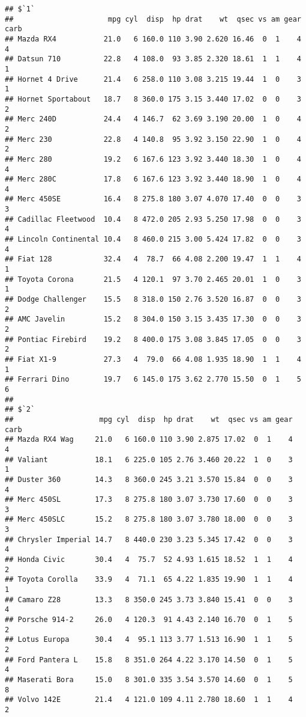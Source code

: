 \documentclass[
]{article}
\begin{document}
\begin{verbatim}
## $`1`
##                      mpg cyl  disp  hp drat    wt  qsec vs am gear carb
## Mazda RX4           21.0   6 160.0 110 3.90 2.620 16.46  0  1    4    4
## Datsun 710          22.8   4 108.0  93 3.85 2.320 18.61  1  1    4    1
## Hornet 4 Drive      21.4   6 258.0 110 3.08 3.215 19.44  1  0    3    1
## Hornet Sportabout   18.7   8 360.0 175 3.15 3.440 17.02  0  0    3    2
## Merc 240D           24.4   4 146.7  62 3.69 3.190 20.00  1  0    4    2
## Merc 230            22.8   4 140.8  95 3.92 3.150 22.90  1  0    4    2
## Merc 280            19.2   6 167.6 123 3.92 3.440 18.30  1  0    4    4
## Merc 280C           17.8   6 167.6 123 3.92 3.440 18.90  1  0    4    4
## Merc 450SE          16.4   8 275.8 180 3.07 4.070 17.40  0  0    3    3
## Cadillac Fleetwood  10.4   8 472.0 205 2.93 5.250 17.98  0  0    3    4
## Lincoln Continental 10.4   8 460.0 215 3.00 5.424 17.82  0  0    3    4
## Fiat 128            32.4   4  78.7  66 4.08 2.200 19.47  1  1    4    1
## Toyota Corona       21.5   4 120.1  97 3.70 2.465 20.01  1  0    3    1
## Dodge Challenger    15.5   8 318.0 150 2.76 3.520 16.87  0  0    3    2
## AMC Javelin         15.2   8 304.0 150 3.15 3.435 17.30  0  0    3    2
## Pontiac Firebird    19.2   8 400.0 175 3.08 3.845 17.05  0  0    3    2
## Fiat X1-9           27.3   4  79.0  66 4.08 1.935 18.90  1  1    4    1
## Ferrari Dino        19.7   6 145.0 175 3.62 2.770 15.50  0  1    5    6
## 
## $`2`
##                    mpg cyl  disp  hp drat    wt  qsec vs am gear carb
## Mazda RX4 Wag     21.0   6 160.0 110 3.90 2.875 17.02  0  1    4    4
## Valiant           18.1   6 225.0 105 2.76 3.460 20.22  1  0    3    1
## Duster 360        14.3   8 360.0 245 3.21 3.570 15.84  0  0    3    4
## Merc 450SL        17.3   8 275.8 180 3.07 3.730 17.60  0  0    3    3
## Merc 450SLC       15.2   8 275.8 180 3.07 3.780 18.00  0  0    3    3
## Chrysler Imperial 14.7   8 440.0 230 3.23 5.345 17.42  0  0    3    4
## Honda Civic       30.4   4  75.7  52 4.93 1.615 18.52  1  1    4    2
## Toyota Corolla    33.9   4  71.1  65 4.22 1.835 19.90  1  1    4    1
## Camaro Z28        13.3   8 350.0 245 3.73 3.840 15.41  0  0    3    4
## Porsche 914-2     26.0   4 120.3  91 4.43 2.140 16.70  0  1    5    2
## Lotus Europa      30.4   4  95.1 113 3.77 1.513 16.90  1  1    5    2
## Ford Pantera L    15.8   8 351.0 264 4.22 3.170 14.50  0  1    5    4
## Maserati Bora     15.0   8 301.0 335 3.54 3.570 14.60  0  1    5    8
## Volvo 142E        21.4   4 121.0 109 4.11 2.780 18.60  1  1    4    2
\end{verbatim}
\end{document}

